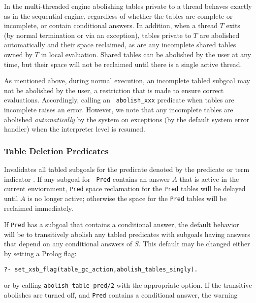 \begin{description}
In the multi-threaded engine abolishing tables private to a thread
behaves exactly as in the sequential engine, regardless of whether the
tables are complete or incomplete, or contain conditional answers.  In
addition, when a thread $T$ exits (by normal termination or via an
exception), tables private to $T$ are abolished automatically and
their space reclaimed, as are any incomplete shared tables owned by
$T$ in local evaluation.  Shared tables can be abolished by the user
at any time, but their space will not be reclaimed until there is a
single active thread.

As mentioned above, during normal execution, an incomplete tabled
subgoal may not be abolished by the user, a restriction that is made
to ensure correct evaluations.  Accordingly, calling an {\tt
  abolish\_xxx} predicate when tables are incomplete raises an error.
However, we note that any incomplete tables are abolished
\emph{automatically} by the system on exceptions (by the default
system error handler) when the interpreter level is resumed.

\subsubsection{Table Deletion Predicates}

\begin{description}

%
Invalidates all tabled subgoals for the predicate denoted by the
predicate or term indicator .  If any subgoal for {\tt
  Pred} contains an answer $A$ that is active in the current
enviornment, {\tt Pred} space reclamation for the {\tt Pred} tables
will be delayed until $A$ is no longer active; otherwise the space for
the {\tt Pred} tables will be reclaimed immediately.  

If {\tt Pred} has a subgoal that contains a conditional answer, the
default behavior will be to transitively abolish any tabled predicates
with subgoals having answers that depend on any conditional answers of
$S$.  This default may be changed either by setting a Prolog flag:
%
\begin{verbatim}
?- set_xsb_flag(table_gc_action,abolish_tables_singly).
\end{verbatim}
% 
or by calling {\tt abolish\_table\_pred/2} with the appropriate
option.  If the transitive abolishes are turned off, and {\tt Pred}
contains a conditional answer, the warning


\end{description}
\end{description}
